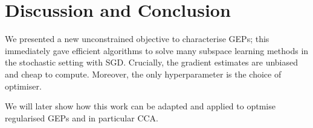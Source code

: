 \section{Discussion and Conclusion}

We presented a new unconstrained objective to characterise GEPs; this immediately gave efficient algorithms to solve many subspace learning methods in the stochastic setting with SGD.
Crucially, the gradient estimates are unbiased and cheap to compute. Moreover, the only hyperparameter is the choice of optimiser.

We will later show how this work can be adapted and applied to optmise regularised GEPs and in particular CCA.